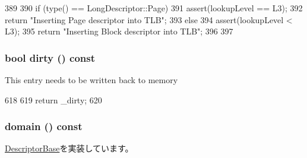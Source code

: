 \begin{DoxyCode}
389         {
390             if (type() == LongDescriptor::Page) {
391                 assert(lookupLevel == L3);
392                 return "Inserting Page descriptor into TLB\n";
393             } else {
394                 assert(lookupLevel < L3);
395                 return "Inserting Block descriptor into TLB\n";
396             }
397         }
\end{DoxyCode}
\hypertarget{classArmISA_1_1TableWalker_1_1LongDescriptor_ade104a269a8f8f3ef5ded192aede7991}{
\subsubsection[{dirty}]{\setlength{\rightskip}{0pt plus 5cm}bool dirty () const}}
\label{classArmISA_1_1TableWalker_1_1LongDescriptor_ade104a269a8f8f3ef5ded192aede7991}
This entry needs to be written back to memory 


\begin{DoxyCode}
618         {
619             return _dirty;
620         }
\end{DoxyCode}
\hypertarget{classArmISA_1_1TableWalker_1_1LongDescriptor_a949a36eac4ce1b6aa2afd933e7e74710}{
\subsubsection[{domain}]{ domain () const}}
\label{classArmISA_1_1TableWalker_1_1LongDescriptor_a949a36eac4ce1b6aa2afd933e7e74710}


\hyperlink{classArmISA_1_1TableWalker_1_1DescriptorBase_af3d561535442b70040e5fd7ff04eff12}{DescriptorBase}を実装しています。


